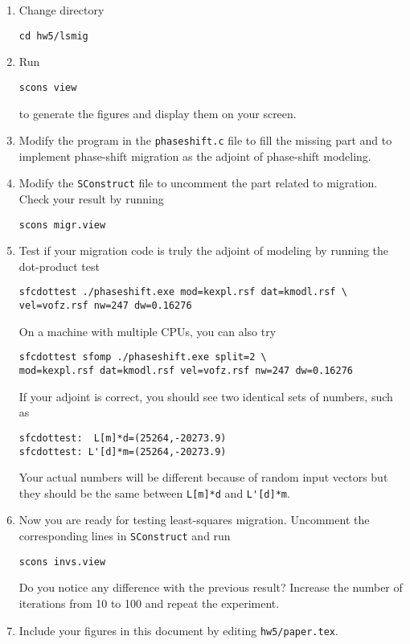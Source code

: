 \begin{enumerate}


\begin{enumerate}
\item Change directory 
\begin{verbatim}
cd hw5/lsmig
\end{verbatim}
\item Run
\begin{verbatim}
scons view
\end{verbatim}
to generate the figures and display them on your screen.
\item Modify the program in the \texttt{phaseshift.c} file to fill the missing part and to implement phase-shift migration as the adjoint of phase-shift modeling. 
\item Modify the \texttt{SConstruct} file to uncomment the part related to migration. Check your result by running
\begin{verbatim}
scons migr.view
\end{verbatim}
\item Test if your migration code is truly the adjoint of modeling by running the dot-product test
\begin{verbatim}
sfcdottest ./phaseshift.exe mod=kexpl.rsf dat=kmodl.rsf \
vel=vofz.rsf nw=247 dw=0.16276
\end{verbatim}
On a machine with multiple CPUs, you can also try
\begin{verbatim}
sfcdottest sfomp ./phaseshift.exe split=2 \
mod=kexpl.rsf dat=kmodl.rsf vel=vofz.rsf nw=247 dw=0.16276
\end{verbatim}
If your adjoint is correct, you should see two identical sets of numbers, such as
\begin{verbatim}
sfcdottest:  L[m]*d=(25264,-20273.9)
sfcdottest: L'[d]*m=(25264,-20273.9)
\end{verbatim}
Your actual numbers will be different because of random input vectors but they should be the same between \verb+L[m]*d+ and \verb+L'[d]*m+.
\item Now you are ready for testing least-squares migration. Uncomment the corresponding lines in \texttt{SConstruct} and run
\begin{verbatim}
scons invs.view
\end{verbatim}
Do you notice any difference with the previous result? Increase the
number of iterations from 10 to 100 and repeat the experiment.  
\item Include your figures in this document by 
  editing \texttt{hw5/paper.tex}.


\end{enumerate}
\end{enumerate}
